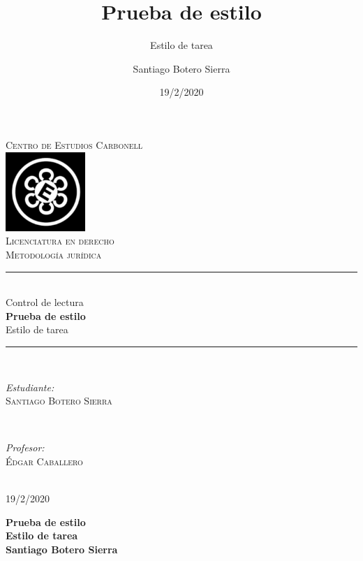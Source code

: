 \documentclass[
          12pt,
              spanish,
                ]{article}
\title{Prueba de estilo}
\subtitle{Estilo de tarea}
\author{Santiago Botero Sierra}
\date{19/2/2020}
\begin{document}
                    \begin{titlepage}
            \newcommand{\HRule}{\rule{\linewidth}{0.5mm}}
            \center
            \textsc{\LARGE Centro de Estudios Carbonell}\\[0.5cm]
            \includegraphics[height=3cm]{CEC.jpg}\\[1cm]
            \textsc{\Large Licenciatura en derecho}\\
            \textsc{\large Metodología jurídica}\\[0.5cm]
            \HRule \\[0.4cm]
            Control de lectura\\[0.2cm]
            { \huge \bfseries Prueba de estilo}\\[0.2cm]
            {\large Estilo de tarea}\\[0.4cm]
            \HRule \\[1cm]
                            \begin{minipage}{0.4\textwidth}
                \begin{flushleft} \large
                \emph{Estudiante:}\\
                \textsc{Santiago Botero Sierra}
                \end{flushleft}
                \end{minipage}\\[1cm]
                                        \begin{minipage}{0.4\textwidth}
                \begin{flushright} \large
                \emph{Profesor:}\\
                \textsc{Édgar Caballero}
                \end{flushright}
                \end{minipage}\\[1cm]
                        {\large 19/2/2020}
            \vfill
            \end{titlepage}
            \begin{flushright}
                \textbf{Prueba de estilo}\\
                \textbf{Estilo de tarea}\\
                \textbf{Santiago Botero Sierra}
            \end{flushright}
                        
\end{document}
